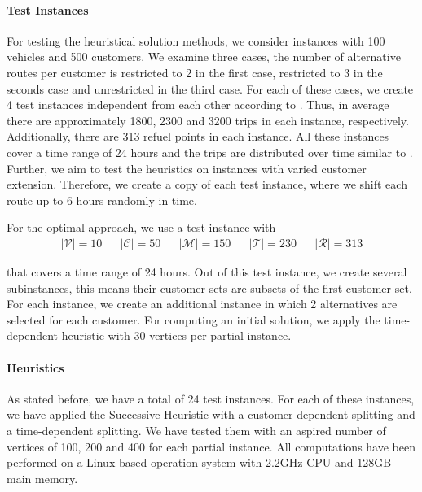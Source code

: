 \paragraph{Test Instances} \parfill

For testing the heuristical solution methods, we consider instances with 100 vehicles and 500 customers. We examine three cases, the number of alternative routes per customer is restricted to 2 in the first case, restricted to 3 in the seconds case and unrestricted in the third case. For each of these cases, we create 4 test instances independent from each other according to . Thus, in average there are approximately 1800, 2300 and 3200 trips in each instance, respectively. Additionally, there are 313 refuel points in each instance. All these instances cover a time range of 24 hours and the trips are distributed over time similar to . Further, we aim to test the heuristics on instances with varied customer extension. Therefore, we create a copy of each test instance, where we shift each route up to 6 hours randomly in time.

For the optimal approach, we use a test instance with
\begin{align*}
	\vert\mathcal{V}\vert = 10 && \vert\mathcal{C}\vert = 50 && \vert\mathcal{M}\vert = 150 && \vert\mathcal{T}\vert = 230 && \vert\mathcal{R}\vert = 313
\end{align*}

that covers a time range of 24 hours. Out of this test instance, we create several subinstances, this means their customer sets are subsets of the first customer set. For each instance, we create an additional instance in which 2 alternatives are selected for each customer. For computing an initial solution, we apply the time-dependent heuristic with 30 vertices per partial instance.

\paragraph{Heuristics} \parfill

As stated before, we have a total of 24 test instances. For each of these instances, we have applied the Successive Heuristic with a customer-dependent splitting and a time-dependent splitting. We have tested them with an aspired number of vertices of 100, 200 and 400 for each partial instance. All computations have been performed on a Linux-based operation system with 2.2GHz CPU and 128GB main memory.

